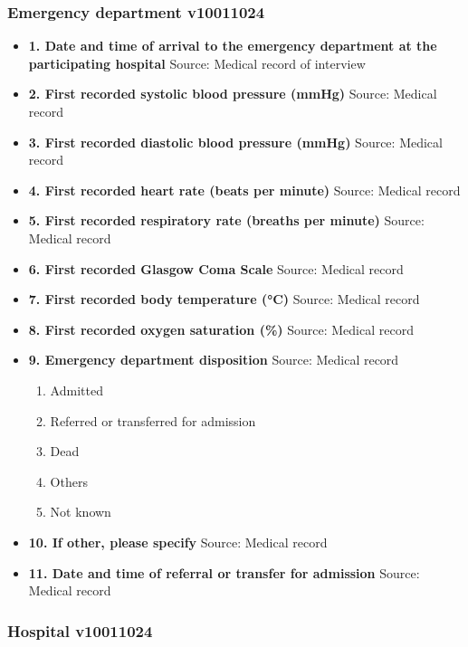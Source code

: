 \documentclass[
]{scrartcl}
\providecommand{\tightlist}{%
  \setlength{\itemsep}{0pt}\setlength{\parskip}{0pt}}\usepackage{longtable,booktabs,array}
\begin{document}
\hypertarget{emergency-department-v10011024}{%
\subsubsection{Emergency department
v10011024}\label{emergency-department-v10011024}}

\begin{itemize}
\item
  \textbf{1. Date and time of arrival to the emergency department at the
  participating hospital} Source: Medical record of interview
\item
  \textbf{2. First recorded systolic blood pressure (mmHg)} Source:
  Medical record
\item
  \textbf{3. First recorded diastolic blood pressure (mmHg)} Source:
  Medical record
\item
  \textbf{4. First recorded heart rate (beats per minute)} Source:
  Medical record
\item
  \textbf{5. First recorded respiratory rate (breaths per minute)}
  Source: Medical record
\item
  \textbf{6. First recorded Glasgow Coma Scale} Source: Medical record
\item
  \textbf{7. First recorded body temperature (°C)} Source: Medical
  record
\item
  \textbf{8. First recorded oxygen saturation (\%)} Source: Medical
  record
\item
  \textbf{9. Emergency department disposition} Source: Medical record

  \begin{enumerate}
  \def\labelenumi{\arabic{enumi}.}
  \tightlist
  \item
    Admitted
  \item
    Referred or transferred for admission
  \item
    Dead
  \item
    Others
  \item
    Not known
  \end{enumerate}
\item
  \textbf{10. If other, please specify} Source: Medical record
\item
  \textbf{11. Date and time of referral or transfer for admission}
  Source: Medical record
\end{itemize}

\hypertarget{hospital-v10011024}{%
\subsubsection{Hospital v10011024}\label{hospital-v10011024}}
\end{document}
